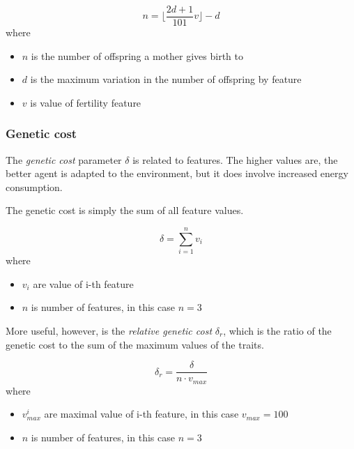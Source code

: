 \begin{description}
    \begin{equation}
        n = \bigg\lfloor {\frac{2d+1}{101} v} \bigg\rfloor - d
    \end{equation}
    where
    \begin{itemize}
        \item $n$ is the number of offspring a mother gives birth to
        \item $d$ is the maximum variation in the number of offspring by feature
        \item $v$ is value of fertility feature
    \end{itemize}
    
\end{description}

\subsubsection{Genetic cost}
The \emph{genetic cost} parameter $\delta$ is related to features. The higher values are, the better agent is adapted to the environment, but it does involve increased energy consumption. 

The genetic cost is simply the sum of all feature values.

\begin{equation}
    \delta = \sum_{i=1}^{n} v_i
\end{equation}
where
\begin{itemize}
    \item $v_i$ are value of i-th feature
    \item $n$ is number of features, in this case $n=3$
\end{itemize}

More useful, however, is the \emph{relative genetic cost} $\delta_r$, which is the ratio of the genetic cost to the sum of the maximum values of the traits.

\begin{equation}
    \delta_r = \frac{\delta}{n \cdot v_{max}} 
\end{equation}
where
\begin{itemize}
    \item $v^i_{max}$ are maximal value of i-th feature, in this case $v_{max} = 100$
    \item $n$ is number of features, in this case $n=3$
\end{itemize}

